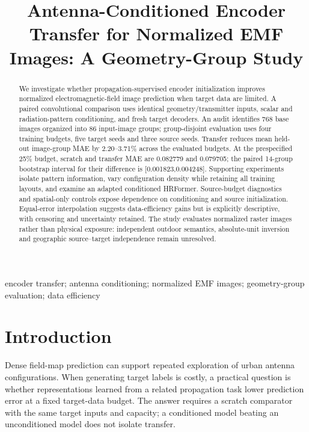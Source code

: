 \documentclass[conference]{IEEEtran}
\begin{document}
\title{Antenna-Conditioned Encoder Transfer for Normalized EMF Images: A Geometry-Group Study}
\author{}
\maketitle
\begin{abstract}
We investigate whether propagation-supervised encoder initialization improves normalized electromagnetic-field image prediction when target data are limited. A paired convolutional comparison uses identical geometry/transmitter inputs, scalar and radiation-pattern conditioning, and fresh target decoders. An audit identifies 768 base images organized into 86 input-image groups; group-disjoint evaluation uses four training budgets, five target seeds and three source seeds. Transfer reduces mean held-out image-group MAE by 2.20--3.71\% across the evaluated budgets. At the prespecified 25\% budget, scratch and transfer MAE are 0.082779 and 0.079705; the paired 14-group bootstrap interval for their difference is [0.001823,0.004248]. Supporting experiments isolate pattern information, vary configuration density while retaining all training layouts, and examine an adapted conditioned HRFormer. Source-budget diagnostics and spatial-only controls expose dependence on conditioning and source initialization. Equal-error interpolation suggests data-efficiency gains but is explicitly descriptive, with censoring and uncertainty retained. The study evaluates normalized raster images rather than physical exposure: independent outdoor semantics, absolute-unit inversion and geographic source--target independence remain unresolved.
\end{abstract}
\begin{IEEEkeywords}
encoder transfer; antenna conditioning; normalized EMF images; geometry-group evaluation; data efficiency
\end{IEEEkeywords}
\section{Introduction}
Dense field-map prediction can support repeated exploration of urban antenna configurations. When generating target labels is costly, a practical question is whether representations learned from a related propagation task lower prediction error at a fixed target-data budget. The answer requires a scratch comparator with the same target inputs and capacity; a conditioned model beating an unconditioned model does not isolate transfer.
\end{document}
